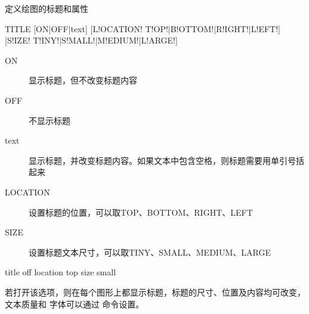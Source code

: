\label{cmd:title}

定义绘图的标题和属性

\begin{SACSTX}
TITLE [ON|OFF|text] [L!OCATION! T!OP!|B!OTTOM!|R!IGHT!|L!EFT!]
    [S!IZE! T!INY!|S!MALL!|M!EDIUM!|L!ARGE!]
\end{SACSTX}

\begin{description}
\item [ON] 显示标题，但不改变标题内容
\item [OFF] 不显示标题
\item [text] 显示标题，并改变标题内容。如果文本中包含空格，则标题需要用单引号括起来
\item [LOCATION] 设置标题的位置，可以取TOP、BOTTOM、RIGHT、LEFT
\item [SIZE] 设置标题文本尺寸，可以取TINY、SMALL、MEDIUM、LARGE
\end{description}

\begin{SACDFT}
title off location top size small
\end{SACDFT}

若打开该选项，则在每个图形上都显示标题，标题的尺寸、位置及内容均可改变，文本质量和
字体可以通过  命令设置。
